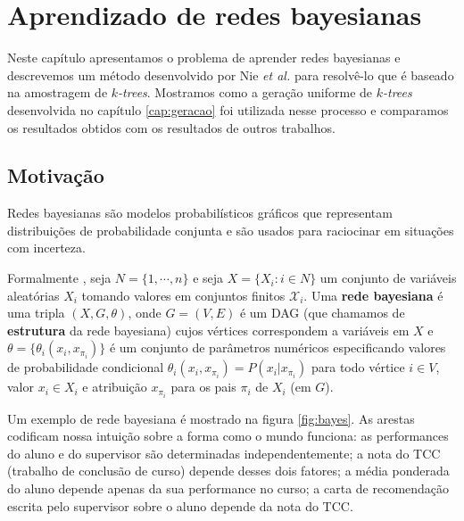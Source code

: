 \chapter{Aprendizado de redes bayesianas}
\label{cap:aprendizado}

Neste capítulo apresentamos o problema de aprender redes bayesianas e descrevemos um método desenvolvido por Nie \emph{et al.} \cite{maua} para resolvê-lo que é baseado na amostragem de \emph{$k$-trees}. Mostramos como a geração uniforme de \emph{$k$-trees} desenvolvida no capítulo \ref{cap:geracao} foi utilizada nesse processo e comparamos os resultados obtidos com os resultados de outros trabalhos.

\section{Motivação}

Redes bayesianas são modelos probabilísticos gráficos que representam distribuições de probabilidade conjunta e são usados para raciocinar em situações com incerteza.

Formalmente \cite{maua}, seja $N = \{ 1, \cdots, n \}$ e seja $X = \{X_i : i \in N\}$ um conjunto de variáveis aleatórias $X_i$ tomando valores em conjuntos finitos $\mathcal{X}_i$. Uma \textbf{rede bayesiana} é uma tripla $(X, G, \theta)$, onde $G = (V, E)$ é um DAG (que chamamos de \textbf{estrutura} da rede bayesiana) cujos vértices correspondem a variáveis em $X$ e $\theta = \{\theta_i(x_i, x_{\pi_i})\}$ é um conjunto de parâmetros numéricos especificando valores de probabilidade condicional $\theta_i(x_i, x_{\pi_i}) = P(x_i | x_{\pi_i})$ para todo vértice $i \in V$, valor $x_i \in X_i$ e atribuição $x_{\pi_i}$ para os pais $\pi_i$ de $X_i$ (em $G$).

Um exemplo de rede bayesiana é mostrado na figura \ref{fig:bayes}. As arestas codificam nossa intuição sobre a forma como o mundo funciona: as performances do aluno e do supervisor são determinadas independentemente; a nota do TCC (trabalho de conclusão de curso) depende desses dois fatores; a média ponderada do aluno depende apenas da sua performance no curso; a carta de recomendação escrita pelo supervisor sobre o aluno depende da nota do TCC.

